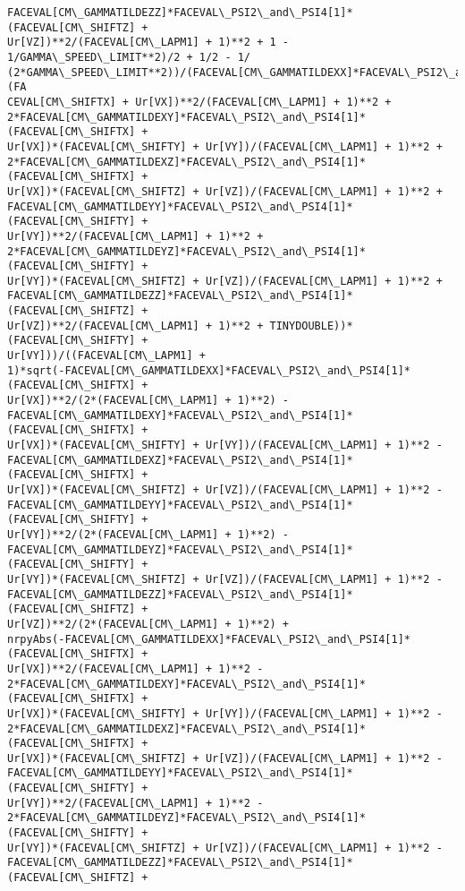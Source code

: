 \documentclass[landscape,letterpaper,10pt,english]{article}
\begin{document}
\begin{Verbatim}[commandchars=\\\{\}]
FACEVAL[CM\_GAMMATILDEZZ]*FACEVAL\_PSI2\_and\_PSI4[1]*(FACEVAL[CM\_SHIFTZ] +
Ur[VZ])**2/(FACEVAL[CM\_LAPM1] + 1)**2 + 1 - 1/GAMMA\_SPEED\_LIMIT**2)/2 + 1/2 - 1/
(2*GAMMA\_SPEED\_LIMIT**2))/(FACEVAL[CM\_GAMMATILDEXX]*FACEVAL\_PSI2\_and\_PSI4[1]*(FA
CEVAL[CM\_SHIFTX] + Ur[VX])**2/(FACEVAL[CM\_LAPM1] + 1)**2 +
2*FACEVAL[CM\_GAMMATILDEXY]*FACEVAL\_PSI2\_and\_PSI4[1]*(FACEVAL[CM\_SHIFTX] +
Ur[VX])*(FACEVAL[CM\_SHIFTY] + Ur[VY])/(FACEVAL[CM\_LAPM1] + 1)**2 +
2*FACEVAL[CM\_GAMMATILDEXZ]*FACEVAL\_PSI2\_and\_PSI4[1]*(FACEVAL[CM\_SHIFTX] +
Ur[VX])*(FACEVAL[CM\_SHIFTZ] + Ur[VZ])/(FACEVAL[CM\_LAPM1] + 1)**2 +
FACEVAL[CM\_GAMMATILDEYY]*FACEVAL\_PSI2\_and\_PSI4[1]*(FACEVAL[CM\_SHIFTY] +
Ur[VY])**2/(FACEVAL[CM\_LAPM1] + 1)**2 +
2*FACEVAL[CM\_GAMMATILDEYZ]*FACEVAL\_PSI2\_and\_PSI4[1]*(FACEVAL[CM\_SHIFTY] +
Ur[VY])*(FACEVAL[CM\_SHIFTZ] + Ur[VZ])/(FACEVAL[CM\_LAPM1] + 1)**2 +
FACEVAL[CM\_GAMMATILDEZZ]*FACEVAL\_PSI2\_and\_PSI4[1]*(FACEVAL[CM\_SHIFTZ] +
Ur[VZ])**2/(FACEVAL[CM\_LAPM1] + 1)**2 + TINYDOUBLE))*(FACEVAL[CM\_SHIFTY] +
Ur[VY]))/((FACEVAL[CM\_LAPM1] +
1)*sqrt(-FACEVAL[CM\_GAMMATILDEXX]*FACEVAL\_PSI2\_and\_PSI4[1]*(FACEVAL[CM\_SHIFTX] +
Ur[VX])**2/(2*(FACEVAL[CM\_LAPM1] + 1)**2) -
FACEVAL[CM\_GAMMATILDEXY]*FACEVAL\_PSI2\_and\_PSI4[1]*(FACEVAL[CM\_SHIFTX] +
Ur[VX])*(FACEVAL[CM\_SHIFTY] + Ur[VY])/(FACEVAL[CM\_LAPM1] + 1)**2 -
FACEVAL[CM\_GAMMATILDEXZ]*FACEVAL\_PSI2\_and\_PSI4[1]*(FACEVAL[CM\_SHIFTX] +
Ur[VX])*(FACEVAL[CM\_SHIFTZ] + Ur[VZ])/(FACEVAL[CM\_LAPM1] + 1)**2 -
FACEVAL[CM\_GAMMATILDEYY]*FACEVAL\_PSI2\_and\_PSI4[1]*(FACEVAL[CM\_SHIFTY] +
Ur[VY])**2/(2*(FACEVAL[CM\_LAPM1] + 1)**2) -
FACEVAL[CM\_GAMMATILDEYZ]*FACEVAL\_PSI2\_and\_PSI4[1]*(FACEVAL[CM\_SHIFTY] +
Ur[VY])*(FACEVAL[CM\_SHIFTZ] + Ur[VZ])/(FACEVAL[CM\_LAPM1] + 1)**2 -
FACEVAL[CM\_GAMMATILDEZZ]*FACEVAL\_PSI2\_and\_PSI4[1]*(FACEVAL[CM\_SHIFTZ] +
Ur[VZ])**2/(2*(FACEVAL[CM\_LAPM1] + 1)**2) +
nrpyAbs(-FACEVAL[CM\_GAMMATILDEXX]*FACEVAL\_PSI2\_and\_PSI4[1]*(FACEVAL[CM\_SHIFTX] +
Ur[VX])**2/(FACEVAL[CM\_LAPM1] + 1)**2 -
2*FACEVAL[CM\_GAMMATILDEXY]*FACEVAL\_PSI2\_and\_PSI4[1]*(FACEVAL[CM\_SHIFTX] +
Ur[VX])*(FACEVAL[CM\_SHIFTY] + Ur[VY])/(FACEVAL[CM\_LAPM1] + 1)**2 -
2*FACEVAL[CM\_GAMMATILDEXZ]*FACEVAL\_PSI2\_and\_PSI4[1]*(FACEVAL[CM\_SHIFTX] +
Ur[VX])*(FACEVAL[CM\_SHIFTZ] + Ur[VZ])/(FACEVAL[CM\_LAPM1] + 1)**2 -
FACEVAL[CM\_GAMMATILDEYY]*FACEVAL\_PSI2\_and\_PSI4[1]*(FACEVAL[CM\_SHIFTY] +
Ur[VY])**2/(FACEVAL[CM\_LAPM1] + 1)**2 -
2*FACEVAL[CM\_GAMMATILDEYZ]*FACEVAL\_PSI2\_and\_PSI4[1]*(FACEVAL[CM\_SHIFTY] +
Ur[VY])*(FACEVAL[CM\_SHIFTZ] + Ur[VZ])/(FACEVAL[CM\_LAPM1] + 1)**2 -
FACEVAL[CM\_GAMMATILDEZZ]*FACEVAL\_PSI2\_and\_PSI4[1]*(FACEVAL[CM\_SHIFTZ] +

\end{Verbatim}
\end{document}
